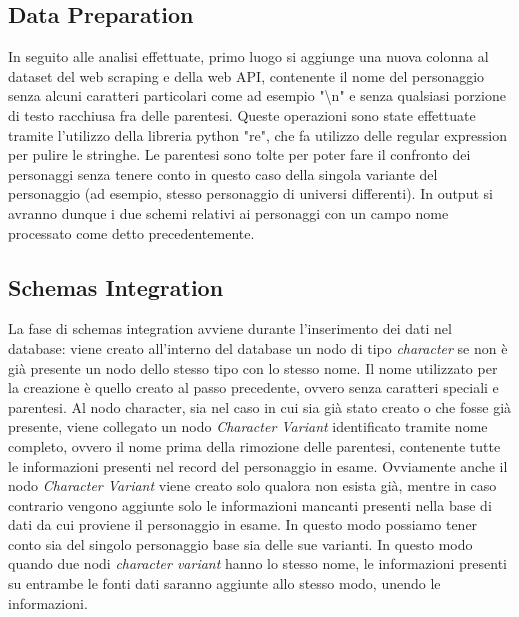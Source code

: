 \documentclass[
12pt, %
a4paper, %
oneside, %
headinclude,footinclude, %
BCOR5mm, %
]{scrartcl}
\begin{document}
\subsection{Data Preparation}
In seguito alle analisi effettuate, primo luogo si aggiunge una nuova colonna al dataset del web scraping e della web API, contenente il nome del personaggio senza alcuni caratteri particolari come ad esempio "\textbackslash n" e senza qualsiasi porzione di testo racchiusa fra delle parentesi. Queste operazioni sono state effettuate tramite l'utilizzo della libreria python "re", che fa utilizzo delle regular expression per pulire le stringhe. Le parentesi sono tolte per poter fare il confronto dei personaggi senza tenere conto in questo caso della singola variante del personaggio (ad esempio, stesso personaggio di universi differenti). In output si avranno dunque i due schemi relativi ai personaggi con un campo nome processato come detto precedentemente.
\subsection{Schemas Integration}
La fase di schemas integration avviene durante l'inserimento dei dati nel database: viene creato all'interno del database un nodo di tipo \textit{character} se non è già presente un nodo dello stesso tipo con lo stesso nome. Il nome utilizzato per la creazione è quello creato al passo precedente, ovvero senza caratteri speciali e parentesi.
Al nodo character, sia nel caso in cui sia già stato creato o che fosse già presente, viene collegato un nodo \textit{Character Variant} identificato tramite nome completo, ovvero il nome prima della rimozione delle parentesi, contenente tutte le informazioni presenti nel record del personaggio in esame. Ovviamente anche il nodo \textit{Character Variant} viene creato solo qualora non esista già, mentre in caso contrario vengono aggiunte solo le informazioni mancanti presenti nella base di dati da cui proviene il personaggio in esame. In questo modo possiamo tener conto sia del singolo personaggio base sia delle sue varianti. In questo modo quando due nodi \textit{character variant} hanno lo stesso nome, le informazioni presenti su entrambe le fonti dati saranno aggiunte allo stesso modo, unendo le informazioni.
\end{document}
